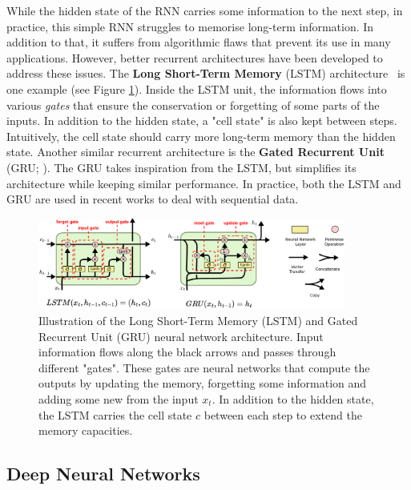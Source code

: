 While the hidden state of the RNN carries some information to the next step, in practice, this simple RNN struggles to memorise long-term information. In addition to that, it suffers from algorithmic flaws that prevent its use in many applications. However, better recurrent architectures have been developed to address these issues. The \textbf{Long Short-Term Memory} (LSTM) architecture~\citep{Hochreiter1997_LSTM} is one example (see Figure \ref{fig:lstm-gru}). Inside the LSTM unit, the information flows into various \textit{gates} that ensure the conservation or forgetting of some parts of the inputs. In addition to the hidden state, a "cell state" is also kept between steps. Intuitively, the cell state should carry more long-term memory than the hidden state. Another similar recurrent architecture is the \textbf{Gated Recurrent Unit} (GRU; \cite{Chung2014_GRU}). The GRU takes inspiration from the LSTM, but simplifies its architecture while keeping similar performance. In practice, both the LSTM and GRU are used in recent works to deal with sequential data. 

\begin{figure}
    \centering
    \includegraphics[width=0.9\textwidth]{Figures/RL/lstm-gru.png}
    \caption[LSTM-GRU]{Illustration of the Long Short-Term Memory (LSTM) and Gated Recurrent Unit (GRU) neural network architecture\footnotemark. Input information flows along the black arrows and passes through different "gates". These gates are neural networks that compute the outputs by updating the memory, forgetting some information and adding some new from the input $x_t$. In addition to the hidden state, the LSTM carries the cell state $c$ between each step to extend the memory capacities.}
    \label{fig:lstm-gru}
\end{figure}


\subsection{Deep Neural Networks}\label{sec:NN:DeepLearning}

